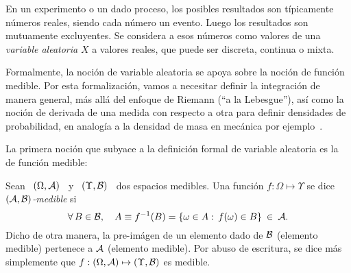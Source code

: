 \label{Sec:MP:variablealeatoria}

En un experimento  o un dado proceso, los  posibles resultados son t\'ipicamente
n\'umeros  reales, siendo  cada n\'umero  un evento.   Luego los  resultados son
mutuamente  excluyentes. Se  considera  a  esos n\'umeros  como  valores de  una
\emph{variable aleatoria} $X$ a valores reales, que puede ser discreta, continua
o mixta.

Formalmente, la  noci\'on de  variable aleatoria se  apoya sobre la  noci\'on de
funci\'on  medible.  Por  esta  formalizaci\'on, vamos  a  necesitar definir  la
integraci\'on de  manera general,  m\'as all\'a del  enfoque de Riemann  (``a la
Lebesgue''), as\'i  como la noci\'on  de derivada de  una medida con  respecto a
otra para  definir densidades  de probabilidad, en  analog\'ia a la  densidad de
masa en mec\'anica por ejemplo~\cite{Leb04, Leb18, KolFom61, AthLah06, Bog07:v1,
  Coh13}.



\label{Ssec:MP:VAPreliminaria}

La primera noci\'on  que subyace a la definici\'on  formal de variable aleatoria
es la de funci\'on medible:

\begin{definicion}
\label{Def:MP:FuncionMedible}
%
 Sean  \ $(\Omega,\mathcal{A})$  \ y  \ $(\Upsilon,\mathcal{B})$  \ dos  espacios  medibles.  Una
  funci\'on $f: \Omega \mapsto \Upsilon$ se dice {\it $(\mathcal{A},\mathcal{B})$-medible} si
  \[
  \forall \,  B \in  \mathcal{B}, \quad  A \equiv f^{-1}(B)  = \left\{  \omega \in  A: \,
    f(\omega) \in B \right\} \: \in \: \mathcal{A}.
  \]
  Dicho de  otra manera, la pre-im\'agen  de un elemento dado  de $\mathcal{B}$ (elemento
  medible) pertenece a $\mathcal{A}$ (elemento medible).  Por abuso de escritura, se dice
  m\'as simplemente que $f: (\Omega,\mathcal{A}) \mapsto (\Upsilon,\mathcal{B})$ es medible.
\end{definicion}

